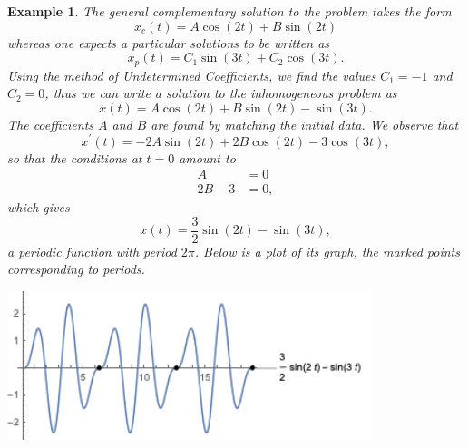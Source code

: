 \documentclass[11pt]{amsart}
\newtheorem{example}{Example}
\numberwithin{equation}{section}
\begin{document}
\begin{example}
The general complementary solution to the problem takes the form
\begin{equation*}
x_c(t)=A\cos(2t)+B\sin(2t)
\end{equation*}
whereas one expects a particular solutions to be written as 
\begin{equation*}
x_p(t)=C_1\sin(3t)+C_2\cos(3t).
\end{equation*}
Using the method of Undetermined Coefficients, we find the values $C_1=-1$ and $C_2=0$, thus we can write a solution to the inhomogeneous problem as 
\begin{equation*}
x(t)=A\cos(2t)+B\sin(2t) -\sin(3t).
\end{equation*}
The coefficients $A$ and $B$ are found by matching the initial data. We observe that 
\begin{equation*}
x^{'}(t)=-2A\sin(2t)+2B\cos(2t)-3\cos(3t),
\end{equation*}
so that the conditions at $t=0$ amount to 
\begin{align*}
 A  & = 0 \\ 
 2B-3 & = 0,
\end{align*}
which gives
\begin{equation*}
x(t)=\frac{3}{2}\sin(2t)-\sin(3t),
\end{equation*}
a periodic function with period $2\pi$. Below is a plot of its graph, the marked points corresponding to periods.
\begin{center}
\includegraphics[width=0.8\textwidth]{p3.png} 
\end{center}
\end{example}
\end{document}
